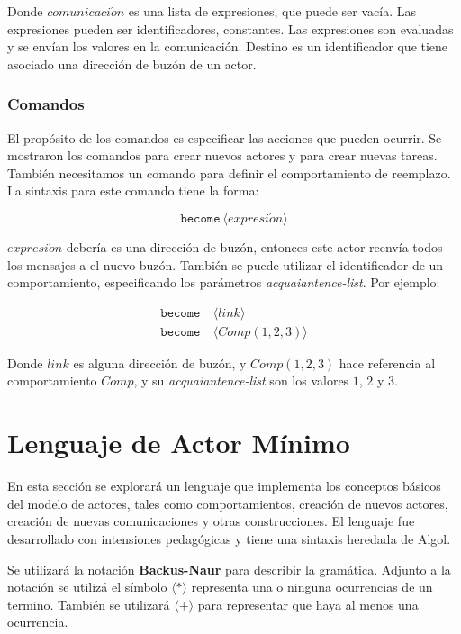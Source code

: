 Donde $comunicaci\acute{o}n$ es una lista de expresiones, que puede ser vacía. Las expresiones pueden ser identificadores, constantes. Las expresiones son evaluadas y se envían los valores en la comunicación. Destino es un identificador que tiene asociado una dirección de buzón de un actor.

\subsubsection*{Comandos}

El propósito de los comandos es especificar las acciones que pueden ocurrir. Se mostraron los comandos para crear nuevos actores y para crear nuevas tareas. También necesitamos un comando para definir el comportamiento de reemplazo. La sintaxis para este comando tiene la forma:

\[
 \texttt{become}\ \langle expresi\acute{o}n \rangle
\]

$expresi\acute{o}n$ debería es una dirección de buzón, entonces este actor reenvía todos los mensajes a el nuevo buzón. También se puede utilizar el identificador de un comportamiento, especificando los parámetros \textit{acquaiantence-list}. Por ejemplo:

\begin{align*}
 \texttt{become}&\ \langle link \rangle \\
 \texttt{become}&\ \langle Comp(1,2,3) \rangle
\end{align*}

Donde $link$ es alguna dirección de buzón, y $Comp(1,2,3)$ hace referencia al comportamiento $Comp$, y su \textit{acquaiantence-list} son los valores $1$, $2$ y $3$.

\section{Lenguaje de Actor Mínimo}\label{actores:sal}

En esta sección se explorará un lenguaje que implementa los conceptos básicos del modelo de actores, tales como comportamientos, creación de nuevos actores, creación de nuevas comunicaciones y otras construcciones. El lenguaje \SAL fue desarrollado con intensiones pedagógicas y tiene una sintaxis heredada de Algol. 

Se utilizará la notación \textbf{Backus-Naur}\cite{McCracken:2003:BF:1074100.1074155} para describir la gramática. Adjunto a la notación se utilizá el símbolo $\langle \textbf{*} \rangle$ representa una o ninguna ocurrencias de un termino. También se utilizará $\langle \textbf{+} \rangle$ para representar que haya al menos una ocurrencia.

